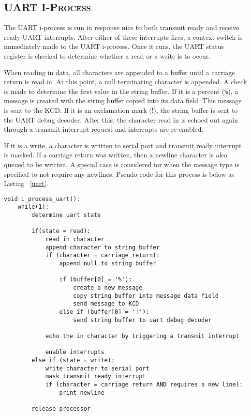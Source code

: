 \documentclass[oneside]{report}
\begin{document}
\subsection{\textsc{UART I-Process}}
The UART i-process is run in response nice to both transmit ready and
receive ready UART interrupts. After either of these interrupts fires,
a context switch is immediately made to the UART i-process. Once it
runs, the UART status register is checked to determine whether a read
or a write is to occur.

When reading in data, all characters are appended to a buffer until a carriage
return is read in. At this point, a null terminating character is appended.  A
check is made to determine the first value in the string buffer. If it is a
percent (\texttt{\%}), a message is created with the string buffer copied into its data
field. This message is sent to the KCD. If it is an exclamation mark (!), the
string buffer is sent to the UART debug decoder. After this, the character read
in is echoed out again through a transmit interrupt request and interrupts are
re-enabled. 

If it is a write, a character is written to serial port and transmit
ready interrupt is masked. If a carriage return was written, then a
newline character is also queued to be written. A special case is
considered for when the message type is specified to not require any
newlines. Pseudo code for this process is below as Listing
~\ref{uart}.

\begin{lstlisting}
void i_process_uart():
    while(1):
        determine uart state

        if(state = read):
            read in character
            append character to string buffer
            if (character = carriage return):
                append null to string buffer            

                if (buffer[0] = '%'):
                    create a new message
                    copy string buffer into message data field
                    send message to KCD
                else if (buffer[0] = '!'):
                    send string buffer to uart debug decoder

            echo the in character by triggering a transmit interrupt

            enable interrupts
        else if (state = write):
            write character to serial port
            mask transmit ready interrupt
            if (character = carriage return AND requires a new line):
                print newline
            
        release processor
\end{lstlisting}
\end{document}
